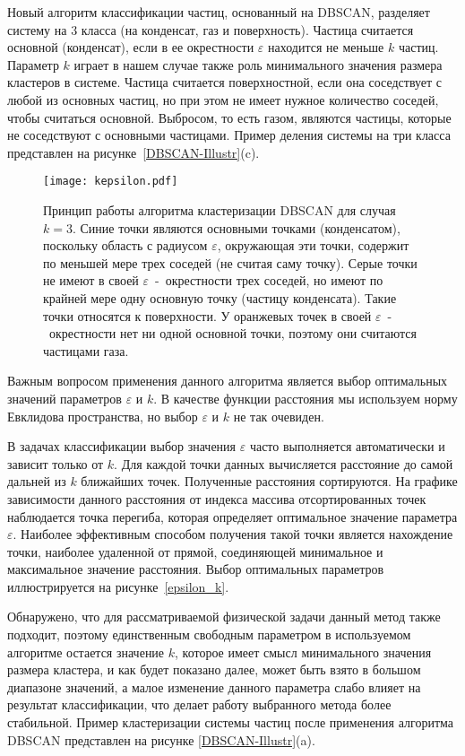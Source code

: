 Новый алгоритм классификации частиц, основанный на DBSCAN, разделяет систему на 3 класса (на конденсат, газ и поверхность).
Частица считается основной (конденсат), если в ее окрестности $\varepsilon$ находится не меньше $k$ частиц.
Параметр $k$ играет в нашем случае также роль минимального значения размера кластеров в системе.
Частица считается поверхностной, если она соседствует с любой из основных частиц, но при этом не имеет нужное количество соседей, чтобы считаться основной.
Выбросом, то есть газом, являются частицы, которые не соседствуют с основными частицами.
Пример деления системы на три класса представлен на рисунке~\ref{DBSCAN-Illustr}(c).

\begin{figure}[!t]
  \centering
  \texttt{[image: kepsilon.pdf]}
  \caption{Принцип работы алгоритма кластеризации DBSCAN для случая $k = 3$.
    Синие точки являются основными точками (конденсатом), поскольку область с радиусом $\varepsilon$, окружающая эти точки, содержит по меньшей мере трех соседей (не считая саму точку).
    Серые точки не имеют в своей $\varepsilon$~-~окрестности трех соседей, но имеют по крайней мере одну основную точку (частицу конденсата).
    Такие точки относятся к поверхности.
    У оранжевых точек в своей $\varepsilon$~-~окрестности нет ни одной основной точки, поэтому они считаются частицами газа.}
  \label{kepsilon}
\end{figure}

Важным вопросом применения данного алгоритма является выбор оптимальных значений параметров $\varepsilon$ и $k$.
В качестве функции расстояния мы используем норму Евклидова пространства, но выбор $\varepsilon$ и $k$ не так очевиден.

В задачах классификации выбор значения $\varepsilon$ часто выполняется автоматически и зависит только от $k$.
Для каждой точки данных вычисляется расстояние до самой дальней из $k$ ближайших точек.
Полученные расстояния сортируются.
На графике зависимости данного расстояния от индекса массива отсортированных точек наблюдается точка перегиба, которая определяет оптимальное значение параметра $\varepsilon$.
Наиболее эффективным способом получения такой точки является нахождение точки, наиболее удаленной от прямой, соединяющей минимальное и максимальное значение расстояния.
Выбор оптимальных параметров иллюстрируется на рисунке~\ref{epsilon_k}.

Обнаружено, что для рассматриваемой физической задачи данный метод также подходит, поэтому единственным свободным параметром в используемом алгоритме остается значение $k$, которое имеет смысл минимального значения размера кластера, и как будет показано далее, может быть взято в большом диапазоне значений, а малое изменение данного параметра слабо влияет на результат классификации, что делает работу выбранного метода более стабильной.
Пример кластеризации системы частиц после применения алгоритма DBSCAN представлен на рисунке \ref{DBSCAN-Illustr}(a).

